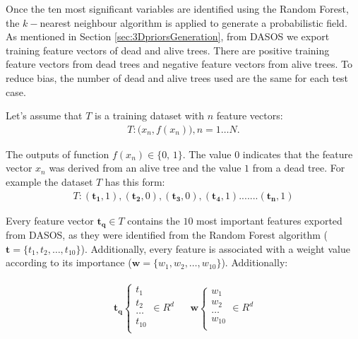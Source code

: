 \documentclass{subfiles}
\begin{document}
\par Once the ten most significant variables are identified using the Random Forest, the $k-$nearest neighbour algorithm is applied to generate a probabilistic field. As mentioned in Section \ref{sec:3DpriorsGeneration}, from DASOS we export training feature vectors of dead and alive trees. There are positive training feature vectors from dead trees and negative feature vectors from alive trees. To reduce bias, the number of dead and alive trees used are the same for each test case. 

\par Let’s assume that  $T$ is a training dataset with $n$ feature vectors:
\begin{eqnarray}
T  : \big(x_n, f(x_n) \big), n=1\dots N. 
\end{eqnarray}

The outputs of function $f(x_n) \in \{\textrm{0, 1} \}$. The value $0$ indicates that the feature vector $x_n$ was derived from an alive tree and the value $1$ from a dead tree. For example the dataset $T$ has this form:
\begin{eqnarray}
T : (\boldsymbol{t_1}, 1), (\boldsymbol{t_2}, 0), (\boldsymbol{t_3}, 0), (\boldsymbol{t_4}, 1) . ...... (\boldsymbol{t_n}, 1)
\end{eqnarray}

\par Every feature vector  $\boldsymbol{t_q} \in T$ contains the $10$ most important features exported from DASOS, as they were identified from the Random Forest algorithm ($\boldsymbol{t}=\{t_1, t_2, \dots , t_{10}\}$). Additionally, every feature is associated with a weight value according to its importance ($\boldsymbol{w}=\{w_1,w_2, \dots ,w_{10} \} $). Additionally:


\begin{gather*}
\begin{align}
\boldsymbol{t_q} 
\begin{cases}
t_1\\    
t_2\\
\dots \\
t_{10} \\ 
\end{cases}
\in R^d &  & \boldsymbol{w}
\begin{cases}
w_1\\    
w_2\\
\dots \\
w_{10} \\    
\end{cases}
\in R^d 
\end{align}
\end{gather*}
\end{document}
